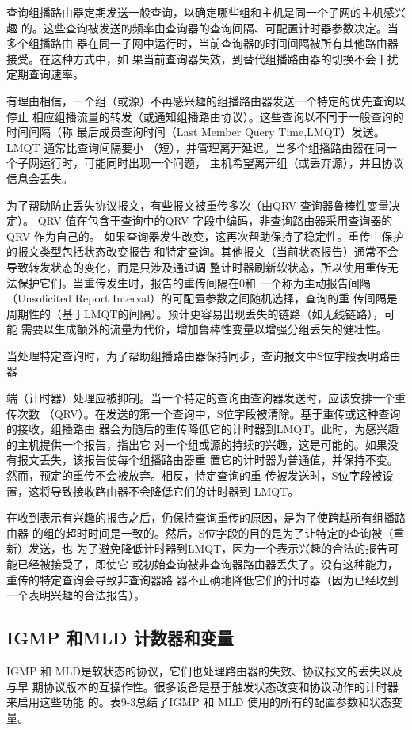 查询组播路由器定期发送一般查询，以确定哪些组和主机是同一个子网的主机感兴趣
的。这些查询被发送的频率由查询器的查询间隔、可配置计时器参数决定。当多个组播路由
器在同一子网中运行时，当前查询器的时间间隔被所有其他路由器接受。在这种方式中，如
果当前查询器失效，到替代组播路由器的切换不会干扰定期查询速率。

有理由相信，一个组（或源）不再感兴趣的组播路由器发送一个特定的优先查询以停止
相应组播流量的转发（或通知组播路由协议）。这些查询以不同于一般查询的时间间隔（称
最后成员查询时间（Last Member Query Time,LMQT）发送。LMQT 通常比查询间隔要小
（短），并管理离开延迟。当多个组播路由器在同一个子网运行时，可能同时出现一个问题，
主机希望离开组（或丢弃源），并且协议信息会丢失。

为了帮助防止丢失协议报文，有些报文被重传多次（由QRV 查询器鲁棒性变量决定）。
QRV 值在包含于查询中的QRV 字段中编码，非查询路由器采用查询器的QRV 作为自己的。
如果查询器发生改变，这再次帮助保持了稳定性。重传中保护的报文类型包括状态改变报告
和特定查询。其他报文（当前状态报告）通常不会导致转发状态的变化，而是只涉及通过调
整计时器刷新软状态，所以使用重传无法保护它们。当重传发生时，报告的重传间隔在0和
一个称为主动报告间隔（Unsolicited Report Interval）的可配置参数之间随机选择，查询的重
传间隔是周期性的（基于LMQT的间隔）。预计更容易出现丢失的链路（如无线链路），可能
需要以生成额外的流量为代价，增加鲁棒性变量以增强分组丢失的健壮性。

当处理特定查询时，为了帮助组播路由器保持同步，查询报文中S位字段表明路由器

端（计时器）处理应被抑制。当一个特定的查询由查询器发送时，应该安排一个重传次数
（QRV）。在发送的第一个查询中，S位字段被清除。基于重传或这种查询的接收，组播路由
器会为随后的重传降低它的计时器到LMQT。此时，为感兴趣的主机提供一个报告，指出它
对一个组或源的持续的兴趣，这是可能的。如果没有报文丢失，该报告使每个组播路由器重
置它的计时器为普通值，并保持不变。然而，预定的重传不会被放弃。相反，特定查询的重
传被发送时，S位字段被设置，这将导致接收路由器不会降低它们的计时器到 LMQT。

在收到表示有兴趣的报告之后，仍保持查询重传的原因，是为了使跨越所有组播路由器
的组的超时时间是一致的。然后，S位字段的目的是为了让特定的查询被（重新）发送，也
为了避免降低计时器到LMQT，因为一个表示兴趣的合法的报告可能已经被接受了，即使它
或初始查询被非查询器路由器丢失了。没有这种能力，重传的特定查询会导致非查询器路
器不正确地降低它们的计时器（因为已经收到一个表明兴趣的合法报告）。

\subsection{IGMP 和MLD 计数器和变量}
IGMP 和 MLD是软状态的协议，它们也处理路由器的失效、协议报文的丢失以及与早
期协议版本的互操作性。很多设备是基于触发状态改变和协议动作的计时器来启用这些功能
的。表9-3总结了IGMP 和 MLD 使用的所有的配置参数和状态变量。

